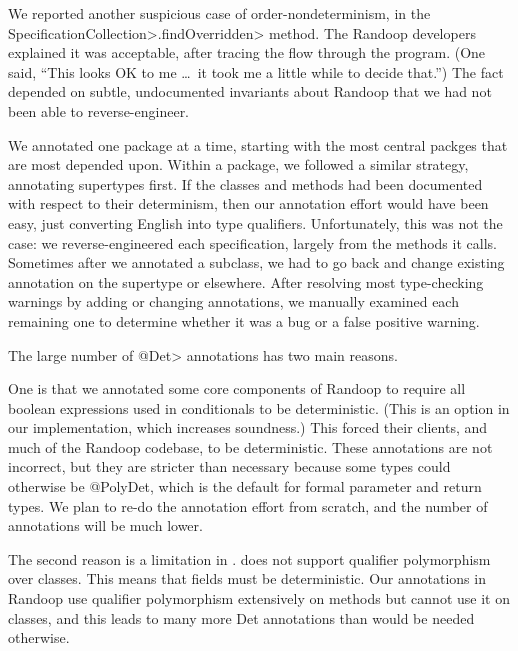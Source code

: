 We reported another suspicious case of order-nondeterminism, in the
\<SpecificationCollection>\-\<.findOverridden> method.  The Randoop developers explained it was
acceptable, after tracing the flow through the program.  (One said, ``This
looks OK to me \ldots\ it took me a little while to decide that.'')  The fact
depended on subtle, undocumented invariants about Randoop that we had not
been able to reverse-engineer.


We annotated one package at a time, starting with the most central packges
that are most depended upon.  Within a package, we followed a similar
strategy, annotating supertypes first.  If the classes and methods had been
documented with respect to their determinism, then our annotation effort
would have been easy, just converting English into type qualifiers.
Unfortunately, this was not the case: we reverse-engineered each
specification, largely from the methods it calls.  Sometimes after we
annotated a subclass, we had to go back and change existing annotation on
the supertype or elsewhere.
After resolving most type-checking warnings by adding or changing
annotations, we manually examined each remaining one to determine whether
it was a bug or a false positive warning.




The large number of \<@Det> annotations has two main reasons.

One is that we annotated some core components of Randoop to require all
boolean expressions used in conditionals to be deterministic.  (This is an
option in our implementation, which increases soundness.)  This forced
their clients, and much of the Randoop codebase, to be deterministic.
These annotations are not incorrect, but they are stricter than necessary
because some types could otherwise be @PolyDet, which is the default for
formal parameter and return types.  We plan to re-do the annotation effort
from scratch, and the number of annotations will be much lower.

The second reason is a limitation in \theDeterminismCheckerImplementation.
\TheDeterminismChecker does not support qualifier polymorphism over
classes.  This means that fields must be deterministic.  Our annotations in
Randoop use qualifier polymorphism extensively on methods but cannot use it
on classes, and this leads to many more Det annotations than would be
needed otherwise.
